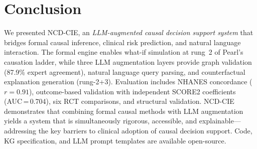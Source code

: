 \documentclass[runningheads]{llncs}
\begin{document}
\section{Conclusion}\label{sec:conclusion}

We presented NCD-CIE, an \emph{LLM-augmented causal decision
support system} that bridges formal causal inference, clinical
risk prediction, and natural language interaction.
The formal engine enables what-if simulation at rung~2 of Pearl's
causation ladder, while three LLM augmentation layers provide
graph validation (87.9\% expert agreement), natural language
query parsing, and counterfactual explanation generation (rung-2+3).
Evaluation includes NHANES concordance ($r = 0.91$), outcome-based
validation with independent SCORE2 coefficients (AUC\,=\,0.704),
six RCT comparisons, and structural validation.
NCD-CIE demonstrates that combining formal causal methods with
LLM augmentation yields a system that is simultaneously rigorous,
accessible, and explainable---addressing the key barriers to
clinical adoption of causal decision support.
Code, KG specification, and LLM prompt templates are available
open-source.
\end{document}

